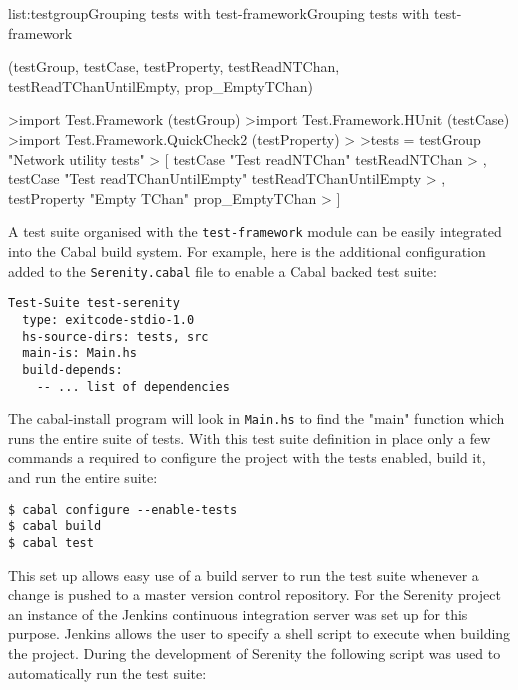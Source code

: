 \vspace{-0.5em}
\begin{listing}{list:testgroup}{Grouping tests with test-framework}{Grouping tests with test-framework}{}
\end{listing}\vspace{-1.5em}

\functions(testGroup, testCase, testProperty, testReadNTChan, testReadTChanUntilEmpty, prop_EmptyTChan)
\begin{haskell}
>import Test.Framework (testGroup)
>import Test.Framework.HUnit (testCase)
>import Test.Framework.QuickCheck2 (testProperty)
>
>tests = testGroup "Network utility tests"
> [ testCase "Test readNTChan" testReadNTChan
> , testCase "Test readTChanUntilEmpty" testReadTChanUntilEmpty
> , testProperty "Empty TChan" prop_EmptyTChan
> ]

\end{haskell}
\noindent
A test suite organised with the \texttt{test-framework} module can be easily integrated into the
Cabal build system.
For example, here is the additional configuration added to the \texttt{Serenity.cabal}
file to enable a Cabal backed test suite:

\begin{verbatim}
Test-Suite test-serenity
  type: exitcode-stdio-1.0
  hs-source-dirs: tests, src
  main-is: Main.hs
  build-depends:
    -- ... list of dependencies
\end{verbatim}

\noindent
The cabal-install program will look in \texttt{Main.hs} to find the "main" function
which runs the entire suite of tests.
With this test suite definition in place only a few commands a required to
configure the project with the tests enabled, build it, and run the entire suite:

\begin{verbatim}
$ cabal configure --enable-tests
$ cabal build
$ cabal test
\end{verbatim}

This set up allows easy use of a build server to run the test suite whenever a change
is pushed to a master version control repository. For the Serenity project an instance
of the Jenkins continuous integration server was set up for this purpose.
Jenkins allows the user to specify a shell script to execute when building the project.
During the development of Serenity the following script was used to automatically run
the test suite:

